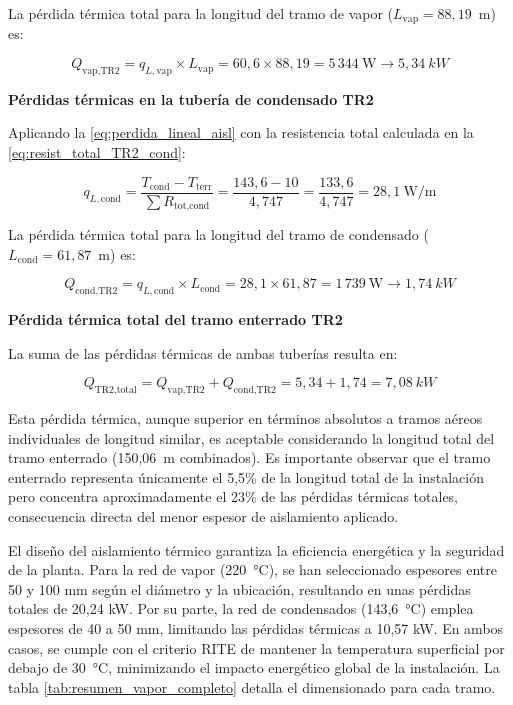 \documentclass[12pt]{article}
\begin{document}
La pérdida térmica total para la longitud del tramo de vapor ($L_{\text{vap}} = 88{,}19$~m) es:

\begin{equation}
	Q_{\text{vap,TR2}} = q_{L,\text{vap}} \times L_{\text{vap}} = 60{,}6 \times 88{,}19 = 5\,344~\text{W} \rightarrow 5{,}34~kW
	\label{eq:perdida_total_TR2_vap}
\end{equation}

\textbf{Pérdidas térmicas en la tubería de condensado TR2}

Aplicando la \eqref{eq:perdida_lineal_aisl} con la resistencia total calculada en la \eqref{eq:resist_total_TR2_cond}:

\begin{equation}
	q_{L,\text{cond}} = \frac{T_{\text{cond}} - T_{\text{terr}}}{\sum R_{\text{tot,cond}}} = \frac{143{,}6 - 10}{4{,}747} = \frac{133{,}6}{4{,}747} = 28{,}1~\text{W/m}
	\label{eq:perdida_lineal_TR2_cond}
\end{equation}

La pérdida térmica total para la longitud del tramo de condensado ($L_{\text{cond}} = 61{,}87$~m) es:

\begin{equation}
	Q_{\text{cond,TR2}} = q_{L,\text{cond}} \times L_{\text{cond}} = 28{,}1 \times 61{,}87 = 1\,739~\text{W} \rightarrow 1{,}74~kW
	\label{eq:perdida_total_TR2_cond}
\end{equation}

\textbf{Pérdida térmica total del tramo enterrado TR2}

La suma de las pérdidas térmicas de ambas tuberías resulta en:

\begin{equation}
	Q_{\text{TR2,total}} = Q_{\text{vap,TR2}} + Q_{\text{cond,TR2}} = 5{,}34 + 1{,}74 = 7{,}08~kW
	\label{eq:perdida_total_TR2}
\end{equation}

Esta pérdida térmica, aunque superior en términos absolutos a tramos aéreos individuales de longitud similar, es aceptable considerando la longitud total del tramo enterrado (150{,}06~m combinados). Es importante observar que el tramo enterrado representa únicamente el 5{,}5\% de la longitud total de la instalación pero concentra aproximadamente el 23\% de las pérdidas térmicas totales, consecuencia directa del menor espesor de aislamiento aplicado.


El diseño del aislamiento térmico garantiza la eficiencia energética y la seguridad de la planta. Para la red de vapor (220~°C), se han seleccionado espesores entre 50 y 100 mm según el diámetro y la ubicación, resultando en unas pérdidas totales de 20,24 kW. Por su parte, la red de condensados (143,6~°C) emplea espesores de 40 a 50 mm, limitando las pérdidas térmicas a 10,57 kW. En ambos casos, se cumple con el criterio RITE de mantener la temperatura superficial por debajo de 30~°C, minimizando el impacto energético global de la instalación. La tabla \ref{tab:resumen_vapor_completo} detalla el dimensionado para cada tramo.
\end{document}
